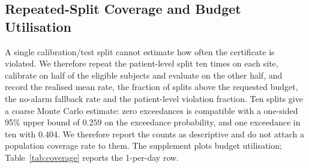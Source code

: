 \subsection{Repeated-Split Coverage and Budget Utilisation}
\label{sec:coverage}

A single calibration/test split cannot estimate how often the certificate is violated. We therefore repeat the patient-level split ten times on each site, calibrate on half of the eligible subjects and evaluate on the other half, and record the realised mean rate, the fraction of splits above the requested budget, the no-alarm fallback rate and the patient-level violation fraction. Ten splits give a coarse Monte Carlo estimate: zero exceedances is compatible with a one-sided 95\% upper bound of $0.259$ on the exceedance probability, and one exceedance in ten with $0.404$. We therefore report the counts as descriptive and do not attach a population coverage rate to them. The supplement plots budget utilisation; Table~\ref{tab:coverage} reports the 1-per-day row.



\begin{table}[tb]
\centering
\caption{Repeated-split coverage at the 1-per-patient-day budget, ten stratified splits per site. ``Rate'' is the mean realised alarms per patient-day, ``Util.'' is rate divided by 1.0, and ``Patient viol.'' is the mean fraction of test patients above the per-patient budget. Blocked, LTT and randomised selectors had no split above the mean budget; CRC crossed it in one of ten A splits at 0.25 per day, consistent with its expected-risk rather than PAC guarantee. Blocked is the empirical-Bernstein selector; LTT is Learn-then-Test with Holm correction; Random. is the randomised adjacent-threshold mixture.}
\label{tab:coverage}
\small
{}
\end{table}

